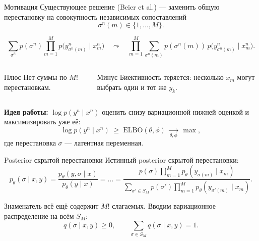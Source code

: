 \documentclass[aspectratio=43, 10pt]{beamer}
\begin{document}
\begin{frame}{Мотивация}
Существующее решение (Beier et al.) --- заменить общую перестановку на совокупность независимых сопоставлений
\[
  \sigma^n(m) \in \{1,\dots,M\}.
\]

\vspace{-0.2em}
\[
  \sum_{\sigma^n} p(\sigma^n)\prod_{m=1}^{M} p \bigl(y^n_{\sigma^n(m)}\mid x^n_m\bigr)
  \quad \leadsto \quad
  \prod_{m=1}^{M}\sum_{\sigma^n(m)} p(\sigma^n(m))\,p \bigl(y^n_{\sigma^n(m)}\mid x^n_m\bigr).
\]

\begin{columns}[T]
\begin{block}{Плюс}
Нет суммы по $M!$ перестановкам.
\end{block}

\begin{alertblock}{Минус}
Биективность теряется: несколько $x_m$ могут выбрать один и тот же $y_k$.
\end{alertblock}
\end{columns}

\vspace{0.5em}
\textbf{Идея работы:} $\log p(y^n\mid x^n)$ оценить снизу вариационной
нижней оценкой и максимизировать уже её:
\[
  \log p(y^n\mid x^n)\;\ge\;\mathrm{ELBO}(\theta,\phi)
  \;\xrightarrow[\theta,\phi]{}\;\max,
\]
где перестановка $\sigma$ --- латентная переменная.
\end{frame}

\begin{frame}{Posterior скрытой перестановки}
\small
Истинный posterior скрытой перестановки:
\[
  p_\theta(\sigma\mid x,y)
  =
  \frac{p_\theta(y,\sigma\mid x)}{p_\theta(y\mid x)}
  = 
  \dots
  =
  \frac{
  p(\sigma)\prod_{m=1}^{M}p_\theta(y_{\sigma(m)}\mid x_m)
  }{
  \sum_{\sigma'\in S_M}
  p(\sigma')\prod_{m=1}^{M}
  p_\theta(y_{\sigma'(m)}\mid x_m)
  }.
\]

\vspace{-0.2em}
\normalsize
Знаменатель всё ещё содержит $M!$ слагаемых. Вводим вариационное распределение на всём $S_M$:
\[
  q(\sigma\mid x,y)\ge 0,\qquad
  \sum_{\sigma\in S_M}q(\sigma\mid x,y)=1.
\]
\end{frame}
\end{document}
